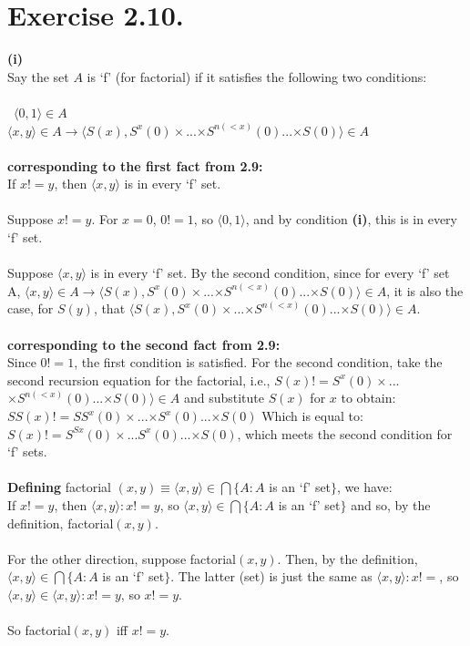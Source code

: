 \documentclass{article}
\begin{document}
\section*{Exercise 2.10.}
\textbf{\large(i)} \\
Say the set $A$ is `f' (for factorial) if it satisfies the following two conditions:\\\\\
$\langle0, 1\rangle \in A$\\
$\langle x, y\rangle \in A \rightarrow \langle S(x), S^{x}(0)  \times$...$\times S^{n(<x)}(0)$...$\times S(0) \rangle \in A $\\\\
\textbf{corresponding to the first fact from 2.9:}\\
If $x!=y$, then $\langle x, y \rangle$ is in every `f' set.\\\\
Suppose $x!=y$. For $x=0$, $0!=1$, so  $\langle 0, 1 \rangle$, and by condition \textbf{\large(i)}, this is in every `f' set. 
\\\\
Suppose $\langle x, y \rangle$ is in every `f' set. By the second condition, since for every `f' set A, $\langle x, y \rangle \in A \rightarrow \langle S(x), S^{x}(0)  \times$...$\times S^{n(<x)}(0)$...$\times S(0) \rangle \in A $, it is also the case, for $S(y)$, that $\langle S(x), S^{x}(0)  \times$...$\times S^{n(<x)}(0)$...$\times S(0) \rangle \in A $.\\\\
\textbf{corresponding to the second fact from 2.9:}\\
Since  $0!=1$, the first condition is satisfied. For the second condition, take the second recursion equation for the factorial, i.e., $S(x)! = S^{x}(0)  \times$...$\times S^{n(<x)}(0)$...$\times S(0) \rangle \in A $ and substitute $S(x)$ for $x$ to obtain:\\
$SS(x)! = SS^{x}(0)  \times$...$\times S^{x}(0)$...$\times S(0)$ Which is equal to:\\
$S(x)! = S^{Sx}(0)  \times$...$S^{x}(0)$...$\times S(0)$, which meets the second condition for `f' sets.\\\\
\textbf{Defining} factorial $(x,y)\equiv \langle x, y \rangle \in \bigcap \{A: A $ is an `f' set$\}$, we have:\\
If $x!= y$, then $\langle x, y \rangle : x!=y$, so $\langle x, y \rangle \in \bigcap \{A: A $ is an `f' set$\}$ and so, by the definition, \quad factorial$(x,y)$.\\\\
For the other direction, suppose factorial$(x,y)$. Then, by the definition,$\langle x, y \rangle \in \bigcap \{A: A $ is an `f' set$\}$. The latter (set) is just the same as $\langle x, y \rangle : x!=$, so $\langle x, y \rangle \in \langle x, y \rangle : x!=y$, so $x!=y$.\\\\
So factorial$(x,y)$ iff $x!=y$.
\end{document}
